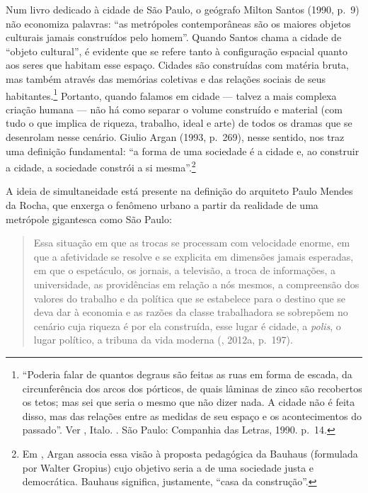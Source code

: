 Num livro dedicado à cidade de São Paulo, o geógrafo Milton Santos
(1990, p.~9) não economiza palavras: ``as metrópoles contemporâneas são
os maiores objetos culturais jamais construídos pelo homem''. Quando
Santos chama a cidade de ``objeto cultural'', é evidente que se refere
tanto à configuração espacial quanto aos seres que habitam esse espaço.
Cidades são construídas com matéria bruta, mas também através das
memórias coletivas e das relações sociais de seus habitantes.\footnote{``Poderia falar de quantos degraus são feitas as ruas em forma de escada, da circunferência dos arcos dos pórticos, de quais lâminas de zinco são recobertos os tetos; mas sei que seria o mesmo que não dizer nada. A cidade não é feita disso, mas das relações entre as medidas de seu espaço e os acontecimentos do passado''. Ver , Italo. {}. São Paulo: Companhia das Letras, 1990. p.~14.} Portanto,
quando falamos em cidade --- talvez a mais complexa criação humana --- não
há como separar o volume construído e material (com tudo o que implica
de riqueza, trabalho, ideal e arte) de todos os dramas que se desenrolam
nesse cenário. Giulio Argan (1993, p.~269), nesse sentido, nos traz uma definição
fundamental: ``a forma de uma sociedade é a cidade e, ao construir a
cidade, a sociedade constrói a si mesma''.\footnote{Em
  {}, Argan associa essa visão à proposta pedagógica da
  Bauhaus (formulada por Walter Gropius) cujo objetivo seria a
  {} de uma sociedade justa e democrática. Bauhaus
  significa, justamente, ``casa da construção''.}

A ideia de simultaneidade está presente na definição do arquiteto Paulo
Mendes da Rocha, que enxerga o fenômeno urbano a
partir da realidade de uma metrópole gigantesca como São Paulo:

\begin{quote}
Essa situação em que as trocas se processam com velocidade enorme, em
que a afetividade se resolve e se explicita em dimensões jamais
esperadas, em que o espetáculo, os jornais, a televisão, a troca de
informações, a universidade, as providências em relação a nós mesmos, a
compreensão dos valores do trabalho e da política que se estabelece para
o destino que se deva dar à economia e as razões da classe trabalhadora
se sobrepõem no cenário cuja riqueza é por ela construída, esse lugar é
cidade, a \emph{polis}, o lugar político, a tribuna da vida moderna (, 2012a, p.~197).
\end{quote}

